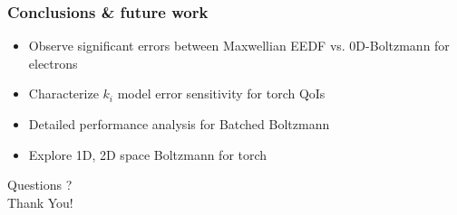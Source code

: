 \documentclass[mathserif, aspectratio=169]{beamer}
\begin{document}
\begin{frame}
	\frametitle{Conclusions \& future work}
	\begin{itemize}
		\item Observe significant errors between Maxwellian EEDF vs. 0D-Boltzmann for electrons %
		\item Characterize $k_i$ model error sensitivity for torch QoIs
		\item Detailed performance analysis for Batched Boltzmann
		\item Explore 1D, 2D space Boltzmann for torch 
	\end{itemize}
	\pause
	\begin{center}
		Questions ? \\
		Thank You!
	\end{center}
\end{frame}
\end{document}
